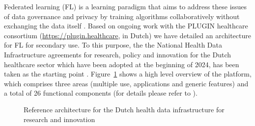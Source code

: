 \documentclass[
  authoryear]{elsarticle}
\begin{document}
Federated learning (FL) is a learning paradigm that aims to address
these issues of data governance and privacy by training algorithms
collaboratively without exchanging the data itself
\citep{rieke2020future, teo2024federated}. Based on ongoing work with
the PLUGIN healthcare consortium (\url{https://plugin.healthcare}, in
Dutch) we have detailed an architecture for FL for secondary use. To
this purpose, the the National Health Data Infrastructure agreements for
research, policy and innovation for the Dutch healthcare sector which
have been adopted at the beginning of 2024, has been taken as the
starting point \citep{healthri2024agreements}.
Figure~\ref{fig-healthri-architecture} shows a high level overview of
the platform, which comprises three areas (multiple use, applications
and generic features) and a total of 26 functional components (for
details please refer to \citep{healthri2024agreements}).

\begin{figure}


\caption{\label{fig-healthri-architecture}Reference architecture for the
Dutch health data infrastructure for research and innovation
\citep{healthri2024agreements}}

\end{figure}%
\end{document}
